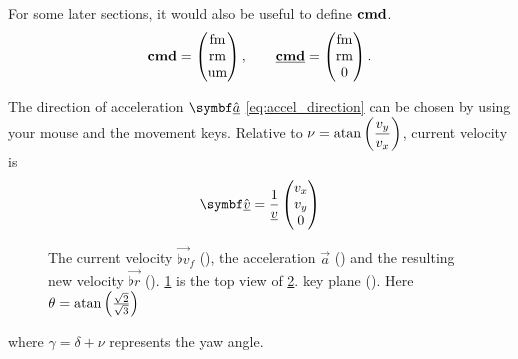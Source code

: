 For some later sections, it would also be useful to define $\boldsymbol{\operatorname{cmd}}$.
\begin{align}
\label{eq:cmd}
\tvec{\cmd} =
\begin{pmatrix}
\fmove \\ \rmove \\ \umove
\end{pmatrix}, \qquad \tvec{\flat{\cmd}} =
\begin{pmatrix}
\fmove \\ \rmove \\ 0
\end{pmatrix}.
\end{align}

The direction of acceleration $\uvec{\flat{a}}$ \eqref{eq:accel_direction} can be chosen by using your mouse and the movement keys. Relative to $\nu = \operatorname{atan}\left(\dfrac{v_y}{v_x}\right)$, current velocity is
\begin{align*}
\uvec{\flat{v}} = \frac{1}{\flat{v}}
\begin{pmatrix}
v_x \\ v_y \\ 0
\end{pmatrix}
\end{align*}

\begin{figure}[H]
	\centering
	\begin{subfigure}[t]{.5\textwidth}
		\centering
		\setlength\figureheight{5.5cm}
		\setlength\figurewidth{5.5cm}
		\caption{}
		\label{fig:fm_rm_um_flat_view}
	\end{subfigure}%
	\begin{subfigure}[t]{.5\textwidth}
		\centering
		\setlength\figureheight{5.5cm}
		\setlength\figurewidth{5.5cm}
		\caption{}
		\label{fig:fm_rm_um_angled_view}
	\end{subfigure}%
	\caption{The current velocity $\vec{\flat{v}}_f$ (\yellowarrow), the acceleration $\vec{a}$ (\orangearrow) and the resulting new velocity $\vec{\flat{r}}$ (\bluearrow). \ref{fig:fm_rm_um_flat_view} is the top view of \ref{fig:fm_rm_um_angled_view}. key plane (\lightorangearea). Here $\theta = \operatorname{atan}\left(\frac{\sqrt{2}}{\sqrt{3}} \right)$}
	\label{fig:cmd}
\end{figure}


where $\gamma = \delta + \nu$ represents the yaw angle.

